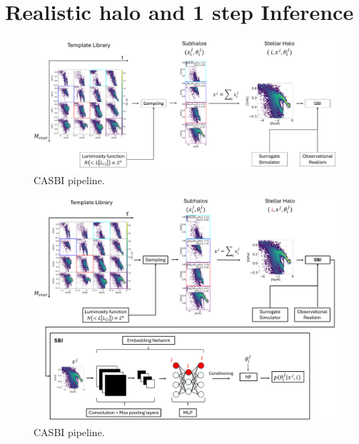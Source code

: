 \section{Realistic halo and 1 step Inference}\label{sec:Realistic halo and 1 step Inference}

\begin{figure}[ht]
    \centering
    \includegraphics[width=1\textwidth]{./figure/CASBI.png}
    \caption{CASBI pipeline.}
    \label{fig:CASBI}
\end{figure}

\begin{figure}[ht]
    \centering
    \includegraphics[width=1\textwidth]{./figure/CASBI_complete.png}
    \caption{CASBI pipeline.}
    \label{fig:CASBI_complete}
\end{figure}


